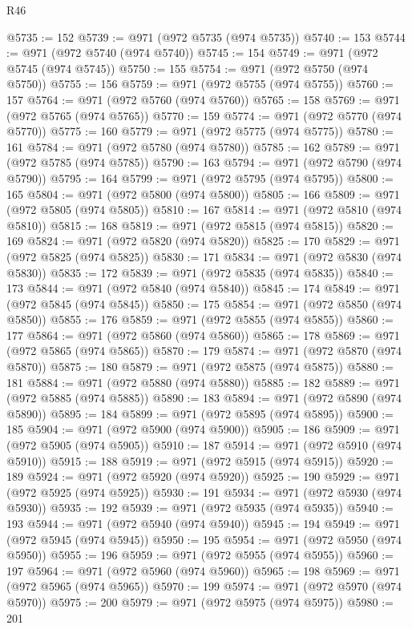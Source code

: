 \begin{lexlean}{R46}
\begin{coremodule}
@5735 := 152
@5739 := @971 (@972 @5735 (@974 @5735))
@5740 := 153
@5744 := @971 (@972 @5740 (@974 @5740))
@5745 := 154
@5749 := @971 (@972 @5745 (@974 @5745))
@5750 := 155
@5754 := @971 (@972 @5750 (@974 @5750))
@5755 := 156
@5759 := @971 (@972 @5755 (@974 @5755))
@5760 := 157
@5764 := @971 (@972 @5760 (@974 @5760))
@5765 := 158
@5769 := @971 (@972 @5765 (@974 @5765))
@5770 := 159
@5774 := @971 (@972 @5770 (@974 @5770))
@5775 := 160
@5779 := @971 (@972 @5775 (@974 @5775))
@5780 := 161
@5784 := @971 (@972 @5780 (@974 @5780))
@5785 := 162
@5789 := @971 (@972 @5785 (@974 @5785))
@5790 := 163
@5794 := @971 (@972 @5790 (@974 @5790))
@5795 := 164
@5799 := @971 (@972 @5795 (@974 @5795))
@5800 := 165
@5804 := @971 (@972 @5800 (@974 @5800))
@5805 := 166
@5809 := @971 (@972 @5805 (@974 @5805))
@5810 := 167
@5814 := @971 (@972 @5810 (@974 @5810))
@5815 := 168
@5819 := @971 (@972 @5815 (@974 @5815))
@5820 := 169
@5824 := @971 (@972 @5820 (@974 @5820))
@5825 := 170
@5829 := @971 (@972 @5825 (@974 @5825))
@5830 := 171
@5834 := @971 (@972 @5830 (@974 @5830))
@5835 := 172
@5839 := @971 (@972 @5835 (@974 @5835))
@5840 := 173
@5844 := @971 (@972 @5840 (@974 @5840))
@5845 := 174
@5849 := @971 (@972 @5845 (@974 @5845))
@5850 := 175
@5854 := @971 (@972 @5850 (@974 @5850))
@5855 := 176
@5859 := @971 (@972 @5855 (@974 @5855))
@5860 := 177
@5864 := @971 (@972 @5860 (@974 @5860))
@5865 := 178
@5869 := @971 (@972 @5865 (@974 @5865))
@5870 := 179
@5874 := @971 (@972 @5870 (@974 @5870))
@5875 := 180
@5879 := @971 (@972 @5875 (@974 @5875))
@5880 := 181
@5884 := @971 (@972 @5880 (@974 @5880))
@5885 := 182
@5889 := @971 (@972 @5885 (@974 @5885))
@5890 := 183
@5894 := @971 (@972 @5890 (@974 @5890))
@5895 := 184
@5899 := @971 (@972 @5895 (@974 @5895))
@5900 := 185
@5904 := @971 (@972 @5900 (@974 @5900))
@5905 := 186
@5909 := @971 (@972 @5905 (@974 @5905))
@5910 := 187
@5914 := @971 (@972 @5910 (@974 @5910))
@5915 := 188
@5919 := @971 (@972 @5915 (@974 @5915))
@5920 := 189
@5924 := @971 (@972 @5920 (@974 @5920))
@5925 := 190
@5929 := @971 (@972 @5925 (@974 @5925))
@5930 := 191
@5934 := @971 (@972 @5930 (@974 @5930))
@5935 := 192
@5939 := @971 (@972 @5935 (@974 @5935))
@5940 := 193
@5944 := @971 (@972 @5940 (@974 @5940))
@5945 := 194
@5949 := @971 (@972 @5945 (@974 @5945))
@5950 := 195
@5954 := @971 (@972 @5950 (@974 @5950))
@5955 := 196
@5959 := @971 (@972 @5955 (@974 @5955))
@5960 := 197
@5964 := @971 (@972 @5960 (@974 @5960))
@5965 := 198
@5969 := @971 (@972 @5965 (@974 @5965))
@5970 := 199
@5974 := @971 (@972 @5970 (@974 @5970))
@5975 := 200
@5979 := @971 (@972 @5975 (@974 @5975))
@5980 := 201

\end{coremodule}
\end{lexlean}
